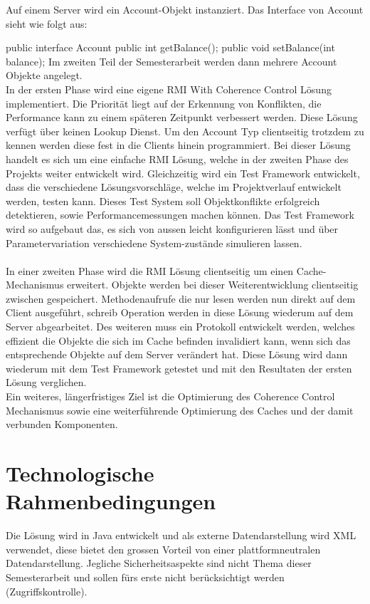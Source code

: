 \documentclass{article}
\begin{document}
Auf einem Server wird ein Account-Objekt instanziert.
Das Interface von Account sieht wie folgt aus:

public interface Account {
    public int getBalance();
    public void setBalance(int balance);    
}
Im zweiten Teil der Semesterarbeit werden dann mehrere Account Objekte angelegt.\\
In der ersten Phase wird eine eigene RMI With Coherence Control Lösung implementiert. Die Priorität liegt auf der Erkennung von Konflikten, die Performance kann zu einem späteren Zeitpunkt verbessert werden. Diese Lösung verfügt über keinen Lookup Dienst. Um den Account Typ clientseitig trotzdem zu kennen werden diese fest in die Clients hinein programmiert. Bei dieser Lösung handelt es sich um eine einfache RMI Lösung, welche in der zweiten Phase des Projekts weiter entwickelt wird.
Gleichzeitig wird ein Test Framework entwickelt, dass die verschiedene Lösungsvorschläge, welche im Projektverlauf entwickelt werden, testen kann. Dieses Test System soll Objektkonflikte erfolgreich detektieren, sowie Performancemessungen machen können. Das Test Framework wird so aufgebaut das, es sich von aussen leicht konfigurieren lässt und über Parametervariation verschiedene System-zustände simulieren lassen.\\
\\
In einer zweiten Phase wird die RMI Lösung clientseitig um einen Cache-Mechanismus erweitert. Objekte werden bei dieser Weiterentwicklung clientseitig zwischen gespeichert. Methodenaufrufe die nur lesen werden nun direkt auf dem Client ausgeführt, schreib Operation werden in diese Lösung wiederum auf dem Server abgearbeitet. Des weiteren muss ein Protokoll entwickelt werden, welches effizient die Objekte die sich im Cache befinden invalidiert kann, wenn sich das entsprechende Objekte auf dem Server verändert hat. Diese Lösung wird dann wiederum mit dem Test Framework getestet und mit den Resultaten der ersten Lösung verglichen.\\
Ein weiteres, längerfristiges Ziel ist die Optimierung des Coherence Control Mechanismus sowie eine weiterführende Optimierung des Caches und der damit verbunden Komponenten.


\section{Technologische Rahmenbedingungen}
Die Lösung wird in Java entwickelt und als externe Datendarstellung wird XML verwendet, diese bietet den grossen Vorteil von einer plattformneutralen Datendarstellung. Jegliche Sicherheitsaspekte sind nicht Thema dieser Semesterarbeit und sollen fürs erste nicht berücksichtigt werden (Zugriffskontrolle).
\end{document}
